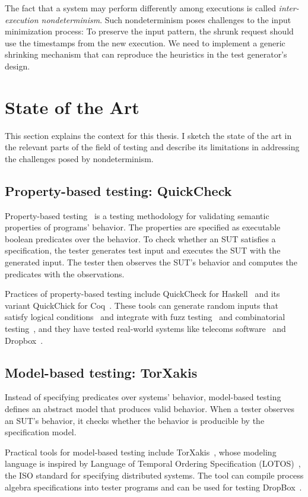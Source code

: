 The fact that a system may perform differently among executions is called {\em
inter-execution nondeterminism}.  Such nondeterminism poses challenges to the
input minimization process: To preserve the input pattern, the shrunk \http
request should use the timestamps from the new execution.  We need to implement
a generic shrinking mechanism that can reproduce the heuristics in the test
generator's design.

\section{State of the Art}
\label{sec:existing-work}
This section explains the context for this thesis.  I sketch the state of the
art in the relevant parts of the field of testing and describe its limitations
in addressing the challenges posed by nondeterminism.

\subsection{Property-based testing: QuickCheck}
Property-based testing~\cite{pbt} is a testing methodology for validating
semantic properties of programs' behavior.  The properties are specified as
executable boolean predicates over the behavior.  To check whether an SUT
satisfies a specification, the tester generates test input and executes the SUT
with the generated input.  The tester then observes the SUT's behavior and
computes the predicates with the observations.

Practices of property-based testing include QuickCheck for Haskell~\cite{qc} and
its variant QuickChick for Coq~\cite{quickchick}.  These tools can generate
random inputs that satisfy logical conditions~\cite{gengood} and integrate with
fuzz testing~\cite{fuzzchick} and combinatorial testing~\cite{judge-cover}, and
they have tested real-world systems like telecoms software~\cite{Quviq2006} and
Dropbox~\cite{testing-dropbox}.

\subsection{Model-based testing: TorXakis}
Instead of specifying predicates over systems' behavior, model-based
testing~\cite{broy2005model} defines an abstract model that produces valid behavior.  When
a tester observes an SUT's behavior, it checks whether the behavior is
producible by the specification model.

Practical tools for model-based testing include TorXakis~\cite{TorXakis}, whose
modeling language is inspired by Language of Temporal Ordering Specification
(LOTOS)~\cite{lotos}, the ISO standard for specifying distributed systems.  The
tool can compile process algebra specifications into tester programs and can be
used for testing DropBox~\cite{torxakis-dropbox}.

